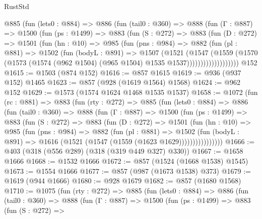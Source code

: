 \begin{lexlean}{RustStd}
\begin{coremodule}
        @885
          (fun (lets0 : @884) =>
          @886
            (fun (tail0 : @360) =>
            @888
              (fun (Γ : @887) =>
              @1500
                (fun (ps : @1499) =>
                @883
                  (fun (S : @272) =>
                  @883
                    (fun (D : @272) =>
                    @1501
                      (fun (hn : @10) =>
                      @985
                        (fun (pns : @984) =>
                        @882
                          (fun (pl : @881) =>
                          @1502
                            (fun (bodyL : @891) =>
                            @1507
                              (@1521
                                (@1547
                                  (@1559
                                    (@1570
                                      (@1573
                                        (@1574
                                          (@962 @1504)
                                          (@965 @1504)
                                          @1535
                                          @1537)))))))))))))))))))
    @152
@1615 := @1503 (@874 @152)
@1616 := @857 @1615
@1619 := @936 (@937 @152) @1465
@1623 := @857 (@928 (@1619 @1564) @1568)
@1624 := @962 @152
@1629 := @1573 (@1574 @1624 @1468 @1535 @1537)
@1658 := @1072
    (fun (rc : @881) =>
    @883
      (fun (rty : @272) =>
      @885
        (fun (lets0 : @884) =>
        @886
          (fun (tail0 : @360) =>
          @888
            (fun (Γ : @887) =>
            @1500
              (fun (ps : @1499) =>
              @883
                (fun (S : @272) =>
                @883
                  (fun (D : @272) =>
                  @1501
                    (fun (hn : @10) =>
                    @985
                      (fun (pns : @984) =>
                      @882
                        (fun (pl : @881) =>
                        @1502
                          (fun (bodyL : @891) =>
                          @1616 (@1521 (@1547 (@1559 (@1623 @1629))))))))))))))))
@1666 := @403 (@318 (@556 @289) (@318 (@319 @449 @327) @330))
@1667 := @1658 @1666
@1668 := @1532 @1666
@1672 := @857 (@1524 (@1668 @1538) @1545)
@1673 := @1554 @1666
@1677 := @857 (@987 (@1673 @1538) @373)
@1679 := @1619 (@944 @1666)
@1680 := @928 @1679
@1682 := @857 (@1680 @1568)
@1710 := @1075
    (fun (rty : @272) =>
    @885
      (fun (lets0 : @884) =>
      @886
        (fun (tail0 : @360) =>
        @888
          (fun (Γ : @887) =>
          @1500
            (fun (ps : @1499) =>
            @883
              (fun (S : @272) =>

\end{coremodule}
\end{lexlean}
